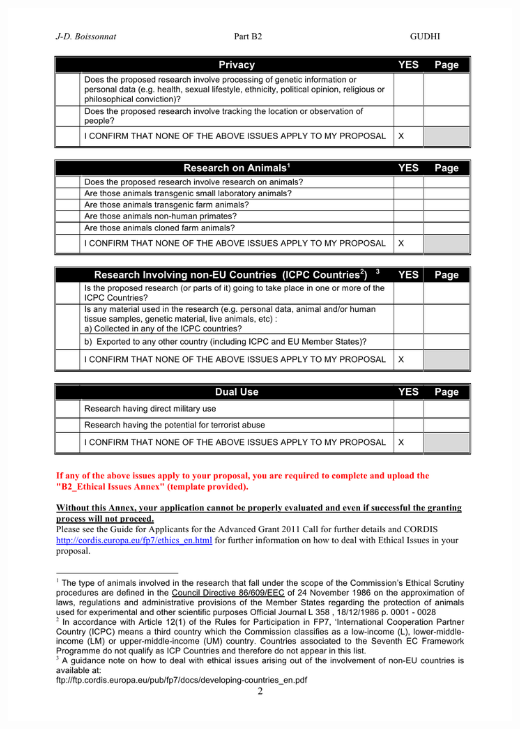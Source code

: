 \begin{center}
\includegraphics[width=\textwidth]{ethics3}
\end{center}

\newpage

{\footnotesize
%


}

